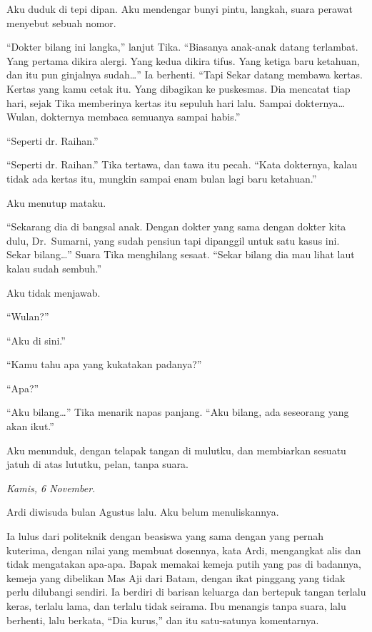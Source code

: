 \documentclass[11pt,twoside,openany]{book}
\makeatletter
\newcommand{\scenebreak}{\par\vspace{0.9em}{\centering\textsc{*\hspace{0.7em}*\hspace{0.7em}*}\par}\vspace{0.9em}\@afterindentfalse\@afterheading}
\makeatother
\begin{document}
Aku duduk di tepi dipan. Aku mendengar bunyi pintu, langkah, suara perawat menyebut sebuah nomor.

``Dokter bilang ini langka,'' lanjut Tika. ``Biasanya anak-anak datang terlambat. Yang pertama dikira alergi. Yang kedua dikira tifus. Yang ketiga baru ketahuan, dan itu pun ginjalnya sudah\ldots{}'' Ia berhenti. ``Tapi Sekar datang membawa kertas. Kertas yang kamu cetak itu. Yang dibagikan ke puskesmas. Dia mencatat tiap hari, sejak Tika memberinya kertas itu sepuluh hari lalu. Sampai dokternya\ldots{} Wulan, dokternya membaca semuanya sampai habis.''

``Seperti dr. Raihan.''

``Seperti dr. Raihan.'' Tika tertawa, dan tawa itu pecah. ``Kata dokternya, kalau tidak ada kertas itu, mungkin sampai enam bulan lagi baru ketahuan.''

Aku menutup mataku.

``Sekarang dia di bangsal anak. Dengan dokter yang sama dengan dokter kita dulu, Dr.~Sumarni, yang sudah pensiun tapi dipanggil untuk satu kasus ini. Sekar bilang\ldots{}'' Suara Tika menghilang sesaat. ``Sekar bilang dia mau lihat laut kalau sudah sembuh.''

Aku tidak menjawab.

``Wulan?''

``Aku di sini.''

``Kamu tahu apa yang kukatakan padanya?''

``Apa?''

``Aku bilang\ldots{}'' Tika menarik napas panjang. ``Aku bilang, ada seseorang yang akan ikut.''

Aku menunduk, dengan telapak tangan di mulutku, dan membiarkan sesuatu jatuh di atas lututku, pelan, tanpa suara.

\scenebreak
\emph{Kamis, 6 November.}

Ardi diwisuda bulan Agustus lalu. Aku belum menuliskannya.

Ia lulus dari politeknik dengan beasiswa yang sama dengan yang pernah kuterima, dengan nilai yang membuat dosennya, kata Ardi, mengangkat alis dan tidak mengatakan apa-apa. Bapak memakai kemeja putih yang pas di badannya, kemeja yang dibelikan Mas Aji dari Batam, dengan ikat pinggang yang tidak perlu dilubangi sendiri. Ia berdiri di barisan keluarga dan bertepuk tangan terlalu keras, terlalu lama, dan terlalu tidak seirama. Ibu menangis tanpa suara, lalu berhenti, lalu berkata, ``Dia kurus,'' dan itu satu-satunya komentarnya.
\end{document}
